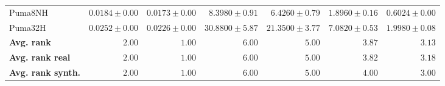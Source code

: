 \begin{table*}[!htbp]
{\begin{tabular}{lrrrrrr}
		Puma8NH & $0.0184 \pm 0.00$ & $\mathbf{0.0173 \pm 0.00}$ & $8.3980 \pm 0.91$ & $6.4260 \pm 0.79$ & $1.8960 \pm 0.16$ & $0.6024 \pm 0.00$\\
		Puma32H & $0.0252 \pm 0.00$ & $\mathbf{0.0226 \pm 0.00}$ & $30.8800 \pm 5.87$ & $21.3500 \pm 3.77$ & $7.0820 \pm 0.53$ & $1.9980 \pm 0.08$\\
		\midrule
		\textbf{{Avg. rank}} & $2.00$ & $\mathbf{1.00}$ & $6.00$ & $5.00$ & $3.87$ & $3.13$\\
		\textbf{{Avg. rank real}} & $2.00$ & $\mathbf{1.00}$ & $6.00$ & $5.00$ & $3.82$ & $3.18$\\
		\textbf{{Avg. rank synth.}} & $2.00$ & $\mathbf{1.00}$ & $6.00$ & $5.00$ & $4.00$ & $3.00$\\
		\bottomrule
	\end{tabular}}
\end{table*}

